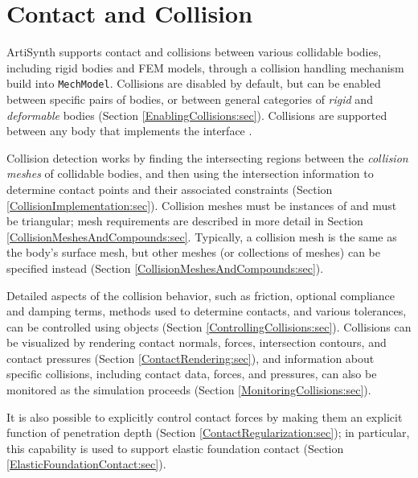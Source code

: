 \ifdefined\maindoc\else
\def\doctitle{Contact and collisions}

\mainmatter
\newlength{\imglength}
\newcommand{\setlengthLaTeXML}[3]{ %
 \iflatexml %
 \setlength{#1}{#2} %
 \else %
 \setlength{#1}{#3} %
 \fi %
}
\fi


\chapter{Contact and Collision}
\label{ContactAndCollision:sec}

ArtiSynth supports contact and collisions between various collidable
bodies, including rigid bodies and FEM models, through a collision
handling mechanism build into {\tt MechModel}. Collisions are disabled
by default, but can be enabled between specific pairs of bodies, or
between general categories of {\it rigid} and {\it deformable} bodies
(Section \ref{EnablingCollisions:sec}). Collisions are supported
between any body that implements the interface
.

Collision detection works by finding the intersecting regions between
the {\it collision meshes} of collidable bodies, and then using the
intersection information to determine contact points and their
associated constraints (Section \ref{CollisionImplementation:sec}).
Collision meshes must be instances of
 and must be triangular;
mesh requirements are described in more detail in Section
\ref{CollisionMeshesAndCompounds:sec}. Typically, a collision mesh
is the same as the body's surface mesh, but other meshes (or
collections of meshes) can be specified instead
(Section \ref{CollisionMeshesAndCompounds:sec}).

Detailed aspects of the collision behavior, such as friction, optional
compliance and damping terms, methods used to determine contacts, and
various tolerances, can be controlled using
 objects
(Section \ref{ControllingCollisions:sec}). Collisions can be
visualized by rendering contact normals, forces, intersection
contours, and contact pressures (Section \ref{ContactRendering:sec}),
and information about specific collisions, including contact data,
forces, and pressures, can also be monitored as the simulation
proceeds (Section \ref{MonitoringCollisions:sec}).  

It is also possible to explicitly control contact forces by making
them an explicit function of penetration depth (Section
\ref{ContactRegularization:sec}); in particular, this capability is
used to support elastic foundation contact (Section
\ref{ElasticFoundationContact:sec}).

